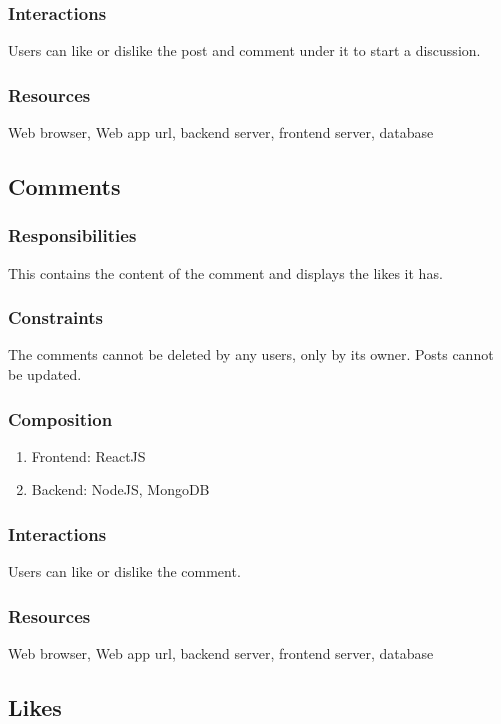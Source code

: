 \documentclass[12pt]{article}
\begin{document}
\subsubsection{Interactions}
Users can like or dislike the post and comment under it to start a discussion.
\subsubsection{Resources}
Web browser, Web app url, backend server, frontend server, database


\subsection{Comments}
\subsubsection{Responsibilities}
This contains the content of the comment and displays the likes it has.

\subsubsection{Constraints}
The comments cannot be deleted by any users, only by its owner. Posts cannot be updated. 

\subsubsection{Composition}
\begin{enumerate}
    \item Frontend: ReactJS
    \item Backend: NodeJS, MongoDB
\end{enumerate}
\subsubsection{Interactions}
Users can like or dislike the comment.

\subsubsection{Resources}
Web browser, Web app url, backend server, frontend server, database



\subsection{Likes}
\end{document}
